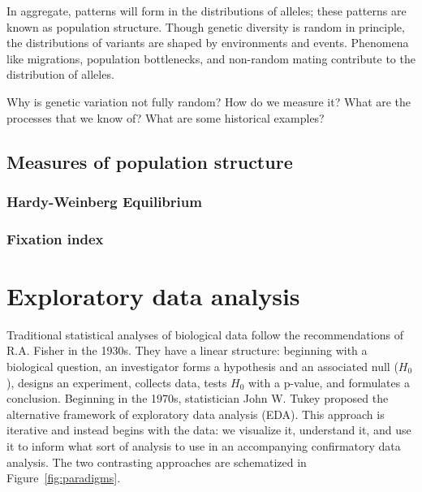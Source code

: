 
In aggregate, patterns will form in the distributions of alleles; these patterns are known as population structure. Though genetic diversity is random in principle, the distributions of variants are shaped by environments and events. Phenomena like migrations, population bottlenecks, and non-random mating contribute to the distribution of alleles.

Why is genetic variation not fully random? How do we measure it? What are the processes that we know of? What are some historical examples?

\subsection{Measures of population structure}

\subsubsection{Hardy-Weinberg Equilibrium}

\subsubsection{Fixation index}

\section{Exploratory data analysis}

Traditional statistical analyses of biological data follow the recommendations of R.A. Fisher in the 1930s\citep{holmes_modern_2019}. They have a linear structure: beginning with a biological question, an investigator forms a hypothesis and an associated null ($H_0$), designs an experiment, collects data, tests $H_0$ with a p-value, and formulates a conclusion. Beginning in the 1970s, statistician John W. Tukey proposed the alternative framework of exploratory data analysis (EDA)\citep{tukey_1977,hoaglin_john_2003}. This approach is iterative and instead begins with the data: we visualize it, understand it, and use it to inform what sort of analysis to use in an accompanying confirmatory data analysis. The two contrasting approaches are schematized in Figure~\ref{fig:paradigms}.

